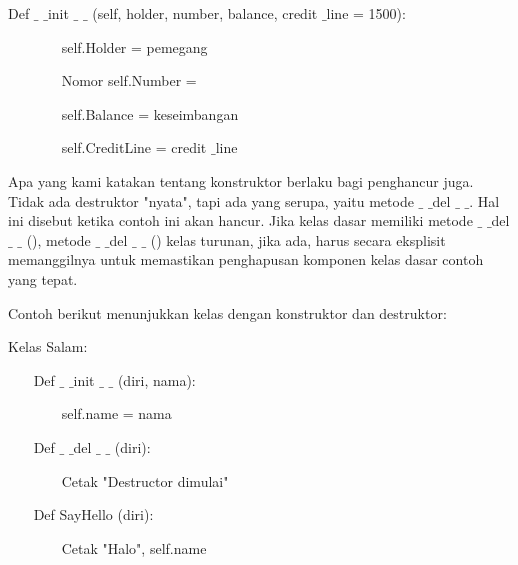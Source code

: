 \vspace{12pt}
\noindent 
Def  $  \_  $ $  \_  $init  $  \_  $ $  \_  $ (self, holder, number, balance, credit $  \_  $line = 1500): \par
\noindent 
~~~~~~~ self.Holder = pemegang \par
\noindent 
~~~~~~~ Nomor self.Number = \par
\noindent 
~~~~~~~ self.Balance = keseimbangan \par
\noindent 
~~~~~~~ self.CreditLine = credit $  \_  $line \par
\vspace{12pt}
Apa yang kami katakan tentang konstruktor berlaku bagi penghancur juga. Tidak ada destruktor "nyata", tapi ada yang serupa, yaitu metode  $  \_  $ $  \_  $del $  \_  $ $  \_  $. Hal ini disebut ketika contoh ini akan hancur. Jika kelas dasar memiliki metode  $  \_  $ $  \_  $del  $  \_  $ $  \_  $ (), metode  $  \_  $ $  \_  $del  $  \_  $ $  \_  $ () kelas turunan, jika ada, harus secara eksplisit memanggilnya untuk memastikan penghapusan komponen kelas dasar contoh yang tepat. \par
\noindent 
Contoh berikut menunjukkan kelas dengan konstruktor dan destruktor: \par
\vspace{12pt}
\vspace{12pt}
\noindent 
Kelas Salam: \par
\noindent 
~~~ Def  $  \_  $ $  \_  $init  $  \_  $ $  \_  $ (diri, nama): \par
\noindent 
~~~~~~~ self.name = nama \par
\noindent 
~~~ Def  $  \_  $ $  \_  $del  $  \_  $ $  \_  $ (diri): \par
\noindent 
~~~~~~~ Cetak "Destructor dimulai" \par
\noindent 
~~~ Def SayHello (diri): \par
\noindent 
~~~~~~~ Cetak "Halo", self.name \par
\vspace{12pt}

